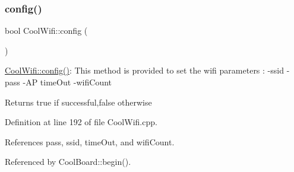 \subsubsection{\texorpdfstring{config()}{config()}\hspace{0.1cm}{\footnotesize\ttfamily [1/2]}}
{\footnotesize\ttfamily bool Cool\+Wifi\+::config (\begin{DoxyParamCaption}{ }\end{DoxyParamCaption})}

\hyperlink{classCoolWifi_a4eb2f6b9b09dd588964b88b6c70122c0}{Cool\+Wifi\+::config()}\+: This method is provided to set the wifi parameters \+: -\/ssid -\/pass -\/\+AP time\+Out -\/wifi\+Count

\begin{DoxyReturn}{Returns}
true if successful,false otherwise 
\end{DoxyReturn}


Definition at line 192 of file Cool\+Wifi.\+cpp.



References pass, ssid, time\+Out, and wifi\+Count.



Referenced by Cool\+Board\+::begin().


